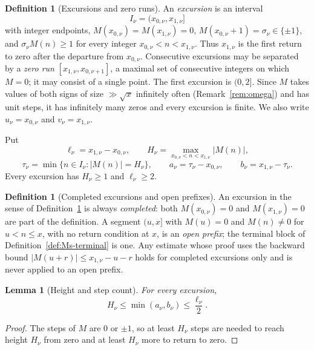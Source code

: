\documentclass[11pt]{amsart}
\numberwithin{equation}{section}
\theoremstyle{plain}
\newtheorem{lemma}[theorem]{Lemma}
\theoremstyle{definition}
\newtheorem{definition}[theorem]{Definition}
\theoremstyle{remark}
\begin{document}
\begin{definition}[Excursions and zero runs]
\label{def:excursion}
An \emph{excursion} is an interval
\[
I_\nu=(x_{0,\nu},x_{1,\nu}]
\]
with integer endpoints, $M(x_{0,\nu})=M(x_{1,\nu})=0$,
$M(x_{0,\nu}+1)=\sigma_\nu\in\{\pm1\}$, and
$\sigma_\nu M(n)\ge1$ for every integer $x_{0,\nu}<n<x_{1,\nu}$. Thus
$x_{1,\nu}$ is the first return to zero after the departure from
$x_{0,\nu}$. Consecutive excursions may be separated by a \emph{zero run}
$[x_{1,\nu},x_{0,\nu+1}]$, a maximal set of consecutive integers on which
$M=0$; it may consist of a single point. The first excursion is $(0,2]$.
Since $M$ takes values of both signs of size $\gg\sqrt x$ infinitely often
(Remark~\ref{rem:omega}) and has unit steps, it has infinitely many zeros
and every excursion is finite. We also write $u_\nu=x_{0,\nu}$ and
$v_\nu=x_{1,\nu}$.

Put
\[
\ell_\nu=x_{1,\nu}-x_{0,\nu},\qquad
H_\nu=\max_{x_{0,\nu}<n<x_{1,\nu}}|M(n)|,
\]
\[
\tau_\nu=\min\{n\in I_\nu:|M(n)|=H_\nu\},\qquad
a_\nu=\tau_\nu-x_{0,\nu},\qquad b_\nu=x_{1,\nu}-\tau_\nu.
\]
Every excursion has $H_\nu\ge1$ and $\ell_\nu\ge2$.
\end{definition}

\begin{definition}[Completed excursions and open prefixes]
\label{def:completed-open}
An excursion in the sense of Definition~\ref{def:excursion} is always
\emph{completed}: both $M(x_{0,\nu})=0$ and $M(x_{1,\nu})=0$ are part of
the definition. A segment $(u,x]$ with $M(u)=0$ and $M(n)\ne0$ for
$u<n\le x$, with no return condition at $x$, is an \emph{open prefix}; the
terminal block of Definition~\ref{def:Ms-terminal} is one. Any estimate
whose proof uses the backward bound $|M(u+r)|\le x_{1,\nu}-u-r$ holds for
completed excursions only and is never applied to an open prefix.
\end{definition}

\begin{lemma}[Height and step count]
\label{lem:height_steps}
For every excursion,
\begin{equation}
\label{eq:height_steps}
H_\nu\le\min(a_\nu,b_\nu)\le\frac{\ell_\nu}{2}.
\end{equation}
\end{lemma}

\begin{proof}
The steps of $M$ are $0$ or $\pm1$, so at least $H_\nu$ steps are needed to
reach height $H_\nu$ from zero and at least $H_\nu$ more to return to zero.
\end{proof}
\end{document}
